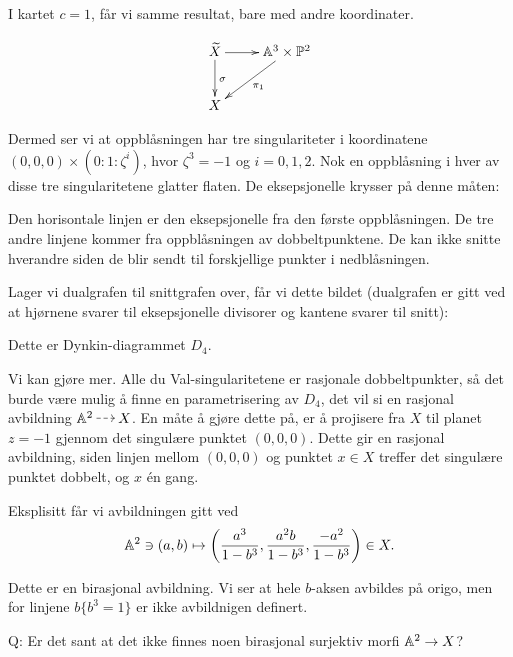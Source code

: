 \documentclass[11pt, norsk]{article}
\begin{document}
I kartet $c=1$, får vi samme resultat, bare med andre koordinater.

$$
\xymatrix{
	\widetilde X \ar[r] \ar[d]^\sigma & \Aa^3 \times \PP^2 \ar[dl]^{\pi_1} \\
	X
}
$$

Dermed ser vi at oppblåsningen har tre singulariteter i koordinatene $(0,0,0) \times (0:1:\zeta^i)$, hvor $\zeta^3=-1$ og $i=0,1,2$. Nok en oppblåsning i hver av disse tre singularitetene glatter flaten. De eksepsjonelle krysser på denne måten:

\begin{center}
\end{center}

Den horisontale linjen er den eksepsjonelle fra den første oppblåsningen. De tre andre linjene kommer fra oppblåsningen av dobbeltpunktene. De kan ikke snitte hverandre siden de blir sendt til forskjellige punkter i nedblåsningen.

Lager vi dualgrafen til snittgrafen over, får vi dette bildet (dualgrafen er gitt ved at hjørnene svarer til eksepsjonelle divisorer og kantene svarer til snitt):

\begin{center}
\end{center}

Dette er Dynkin-diagrammet $D_4$. 

Vi kan gjøre mer. Alle du Val-singularitetene er rasjonale dobbeltpunkter, så det burde være mulig å finne en parametrisering av $D_4$, det vil si en rasjonal avbildning $\Aa^2 \rmap X$. En måte å gjøre dette på, er å projisere fra $X$ til planet $z=-1$ gjennom det singulære punktet $(0,0,0)$. Dette gir en rasjonal avbildning, siden linjen mellom $(0,0,0)$ og punktet $x \in X$ treffer det singulære punktet dobbelt, og $x$ én gang.

Eksplisitt får vi avbildningen gitt ved
$$
\mathbb{A}^2 \ni (a,b) \mapsto \left( \frac{a^3}{1-b^3}, \frac{a^2b}{1-b^3}, \frac{-a^2}{1-b^3}\right) \in X.
$$

Dette er en birasjonal avbildning. Vi ser at hele $b$-aksen avbildes på origo, men for linjene $b\{b^3=1\}$ er ikke avbildnigen definert.

Q: Er det sant at det ikke finnes noen birasjonal surjektiv morfi $\mathbb{A}^2 \to X$? 
\end{document}
